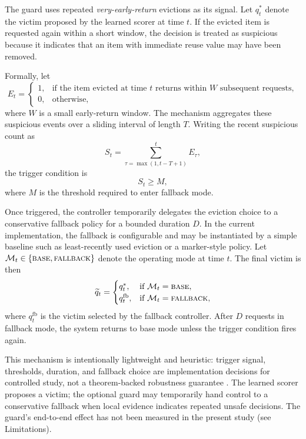 \documentclass[preprint,12pt]{elsarticle}
\begin{document}
The guard uses repeated \emph{very-early-return} evictions as its signal. Let $q_t^{*}$ denote the victim proposed by the learned scorer at time $t$. If the evicted item is requested again within a short window, the decision is treated as suspicious because it indicates that an item with immediate reuse value may have been removed.

Formally, let
\begin{equation}
E_t =
\begin{cases}
1, & \text{if the item evicted at time } t \text{ returns within } W \text{ subsequent requests},\\
0, & \text{otherwise},
\end{cases}
\label{eq:early_return_signal}
\end{equation}
where $W$ is a small early-return window. The mechanism aggregates these suspicious events over a sliding interval of length $T$. Writing the recent suspicious count as
\begin{equation}
S_t = \sum_{\tau=\max(1,t-T+1)}^{t} E_{\tau},
\label{eq:suspicious_count}
\end{equation}
the trigger condition is
\begin{equation}
S_t \geq M,
\label{eq:guard_trigger}
\end{equation}
where $M$ is the threshold required to enter fallback mode.

Once triggered, the controller temporarily delegates the eviction choice to a conservative fallback policy for a bounded duration $D$. In the current implementation, the fallback is configurable and may be instantiated by a simple baseline such as least-recently used eviction or a marker-style policy. Let $\mathcal{M}_t \in \{\textsc{base}, \textsc{fallback}\}$ denote the operating mode at time $t$. The final victim is then
\begin{equation}
\widetilde{q}_t =
\begin{cases}
q_t^{*}, & \text{if } \mathcal{M}_t = \textsc{base},\\
q_t^{\mathrm{fb}}, & \text{if } \mathcal{M}_t = \textsc{fallback},
\end{cases}
\label{eq:final_victim}
\end{equation}
where $q_t^{\mathrm{fb}}$ is the victim selected by the fallback controller. After $D$ requests in fallback mode, the system returns to base mode unless the trigger condition fires again.

This mechanism is intentionally lightweight and heuristic: trigger signal, thresholds, duration, and fallback choice are implementation decisions for controlled study, not a theorem-backed robustness guarantee \cite{wei2020better_simpler_lac,chledowski2021robust_lac_experimental}. The learned scorer proposes a victim; the optional guard may temporarily hand control to a conservative fallback when local evidence indicates repeated unsafe decisions. The guard's end-to-end effect has not been measured in the present study (see Limitations).
\end{document}
